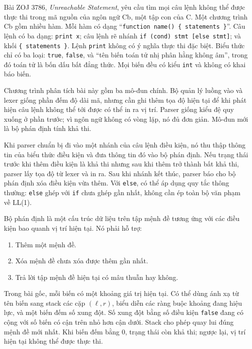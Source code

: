 \documentclass[11pt]{article}
\begin{document}
Bài ZOJ 3786, \emph{Unreachable Statement}, yêu cầu tìm mọi câu lệnh không thể
được thực thi trong mã nguồn của ngôn ngữ Cb, một tập con của C. Một chương
trình Cb gồm nhiều hàm. Mỗi hàm có dạng
``\texttt{function name() \{ statements \}}''. Câu lệnh có ba dạng:
\texttt{print x}; câu lệnh rẽ nhánh \texttt{if (cond) stmt [else stmt]}; và
khối \texttt{\{ statements \}}. Lệnh \texttt{print} không có ý nghĩa thực thi đặc
biệt. Biểu thức chỉ có ba loại: \texttt{true}, \texttt{false}, và ``tên biến
toán tử nhị phân hằng không âm'', trong đó toán tử là bốn dấu bất đẳng thức.
Mọi biến đều có kiểu \texttt{int} và không có khai báo biến.

Chương trình phân tích bài này gồm ba mô-đun chính. Bộ quản lý luồng vào và
lexer giống phần đếm độ dài mã, nhưng cần ghi thêm tọa độ hiện tại để khi phát
hiện câu lệnh không thể tới được có thể in ra vị trí. Parser giống kiểu đệ quy
xuống ở phần trước; vì ngôn ngữ không có vòng lặp, nó đủ đơn giản. Mô-đun mới
là bộ phán định tính khả thi.

Khi parser chuẩn bị đi vào một nhánh của câu lệnh điều kiện, nó thu thập thông
tin của biểu thức điều kiện và đưa thông tin đó vào bộ phán định. Nếu trạng thái
trước khi thêm điều kiện là khả thi nhưng sau khi thêm trở thành bất khả thi,
parser lấy tọa độ từ lexer và in ra. Sau khi nhánh kết thúc, parser báo cho bộ
phán định xóa điều kiện vừa thêm. Với \texttt{else}, có thể áp dụng quy tắc
thông thường: \texttt{else} ghép với \texttt{if} chưa ghép gần nhất, không cần
ép toàn bộ văn phạm về LL(1).

Bộ phán định là một cấu trúc dữ liệu trên tập mệnh đề tương ứng với các điều
kiện bao quanh vị trí hiện tại. Nó phải hỗ trợ:

\begin{enumerate}
  \item Thêm một mệnh đề.
  \item Xóa mệnh đề chưa xóa được thêm gần nhất.
  \item Trả lời tập mệnh đề hiện tại có mâu thuẫn hay không.
\end{enumerate}

Trong bài gốc, mỗi biến có một khoảng giá trị hiện tại. Có thể dùng ánh xạ từ
tên biến sang stack các cặp \((\ell,r)\), biểu diễn các ràng buộc khoảng đang
hiệu lực, và một biến đếm số xung đột. Số xung đột bằng số điều kiện
\texttt{false} đang có cộng với số biến có cận trên nhỏ hơn cận dưới. Stack cho
phép quay lui đúng mệnh đề mới nhất. Khi biến đếm bằng \(0\), trạng thái còn
khả thi; ngược lại, vị trí hiện tại không thể được thực thi.
\end{document}
